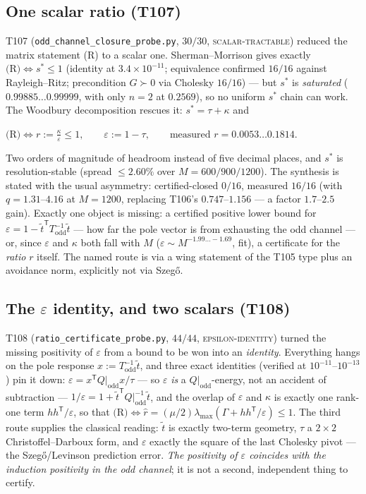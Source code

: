 \documentclass[11pt,a4paper]{article}
\begin{document}
\subsection{One scalar ratio (T107)}
T107 (\texttt{odd\_channel\_closure\_probe.py}, $30/30$, \textsc{scalar-tractable}) reduced the matrix
statement (R) to a scalar one. Sherman--Morrison gives exactly
$\text{(R)}\iff s^*\le1$ (identity at $3.4\times10^{-11}$; equivalence confirmed $16/16$ against
Rayleigh--Ritz; precondition $G\succ0$ via Cholesky $16/16$) --- but $s^*$ is \emph{saturated}
($0.99885\ldots0.99999$, with only $n=2$ at $0.2569$), so no uniform $s^*$ chain can work. The Woodbury
decomposition rescues it: $s^*=\tau+\kappa$ and

\begin{keyeq}$\displaystyle
\text{(R)}\iff r:=\frac{\kappa}{\varepsilon}\le1,\qquad \varepsilon:=1-\tau,
\qquad\text{measured } r=0.0053\ldots0.1814 .$\end{keyeq}

\noindent Two orders of magnitude of headroom instead of five decimal places, and $s^*$ is
resolution-stable (spread $\le2.60\%$ over $M=600/900/1200$). The synthesis is stated with the usual
asymmetry: certified-closed $0/16$, measured $16/16$ (with $q=1.31$--$4.16$ at $M=1200$, replacing
T106's $0.747$--$1.156$ --- a factor $1.7$--$2.5$ gain). Exactly one object is missing: a certified
positive lower bound for $\varepsilon=1-\tilde t^{\mathsf T}T_{\mathrm{odd}}^{-1}\tilde t$ --- how far
the pole vector is from exhausting the odd channel --- or, since $\varepsilon$ and $\kappa$ both fall
with $M$ ($\varepsilon\sim M^{-1.99\ldots-1.69}$, fit), a certificate for the \emph{ratio} $r$ itself.
The named route is via a wing statement of the T105 type plus an avoidance norm, explicitly not via
Szeg\H{o}.

\subsection{The \texorpdfstring{$\varepsilon$}{epsilon} identity, and two scalars (T108)}
T108 (\texttt{ratio\_certificate\_probe.py}, $44/44$, \textsc{epsilon-identity}) turned the missing
positivity of $\varepsilon$ from a bound to be won into an \emph{identity}. Everything hangs on the pole
response $x:=T_{\mathrm{odd}}^{-1}\tilde t$, and three exact identities (verified at
$10^{-11}$--$10^{-13}$) pin it down:
$\varepsilon=x^{\mathsf T}Q|_{\mathrm{odd}}x/\tau$ --- so $\varepsilon$ \emph{is} a
$Q|_{\mathrm{odd}}$-energy, not an accident of subtraction ---
$1/\varepsilon=1+\tilde t^{\mathsf T}Q|_{\mathrm{odd}}^{-1}\tilde t$, and the overlap of $\varepsilon$
and $\kappa$ is exactly one rank-one term $hh^{\mathsf T}/\varepsilon$, so that
$\text{(R)}\iff\hat r=(\mu/2)\lambda_{\max}(\Gamma+hh^{\mathsf T}/\varepsilon)\le1$. The third route
supplies the classical reading: $\tilde t$ is exactly two-term geometry, $\tau$ a $2\times2$
Christoffel--Darboux form, and $\varepsilon$ exactly the square of the last Cholesky pivot --- the
Szeg\H{o}/Levinson prediction error. \emph{The positivity of $\varepsilon$ coincides with the induction
positivity in the odd channel}; it is not a second, independent thing to certify.
\end{document}
